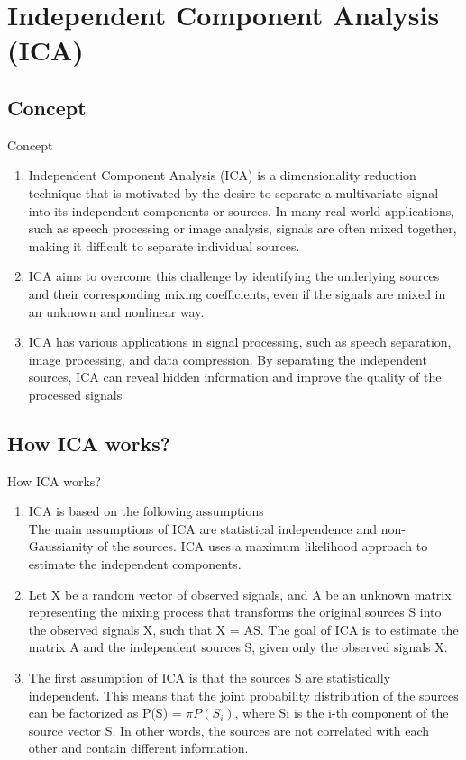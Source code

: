 \documentclass{beamer}
\begin{document}
\section{Independent Component Analysis (ICA)}
\subsection{Concept}
\begin{frame}{Concept}
    \begin{enumerate}
        \item Independent Component Analysis (ICA) is a dimensionality reduction technique that is motivated by the desire to separate a multivariate signal into its independent components or sources. In many real-world applications, such as speech processing or image analysis, signals are often mixed together, making it difficult to separate individual sources.
        \item  ICA aims to overcome this challenge by identifying the underlying sources and their corresponding mixing coefficients, even if the signals are mixed in an unknown and nonlinear way.
        \item ICA has various applications in signal processing, such as speech separation, image processing, and data compression. By separating the independent sources, ICA can reveal hidden information and improve the quality of the processed signals
    \end{enumerate}
\end{frame}

\subsection{How ICA works?}
\begin{frame}{How ICA works?}
    \begin{enumerate}
        \item ICA is based on the following assumptions\\
              The main assumptions of ICA are statistical independence and non-Gaussianity of the sources. ICA uses a maximum likelihood approach to estimate the independent components.
        \item Let X be a random vector of observed signals, and A be an unknown matrix representing the mixing process that transforms the original sources S into the observed signals X, such that X = AS. The goal of ICA is to estimate the matrix A and the independent sources S, given only the observed signals X.
        \item The first assumption of ICA is that the sources S are statistically independent. This means that the joint probability distribution of the sources can be factorized as P(S) = $\pi P(S_i)$, where Si is the i-th component of the source vector S. In other words, the sources are not correlated with each other and contain different information.

    \end{enumerate}
\end{frame}
\end{document}
